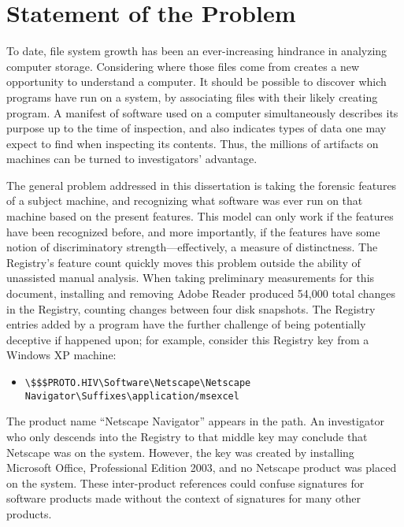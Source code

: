 \documentclass[11pt]{ucthesis}
\theoremstyle{plain}
\theoremstyle{definition}
\newcommand{\breakingbackslash}{\textbackslash\allowbreak{}}
\begin{document}
\section{Statement of the Problem}

To date, file system growth has been an ever-increasing hindrance in analyzing computer storage.  Considering where those files come from creates a new opportunity to understand a computer.  It should be possible to discover which programs have run on a system, by associating files with their likely creating program.  A manifest of software used on a computer simultaneously describes its purpose up to the time of inspection, and also indicates types of data one may expect to find when inspecting its contents.  Thus, the millions of artifacts on machines can be turned to investigators' advantage.

The general problem addressed in this dissertation is taking the forensic features of a subject machine, and recognizing what software was ever run on that machine based on the present features.  This model can only work if the features have been recognized before, and more importantly, if the features have some notion of discriminatory strength---effectively, a measure of distinctness.  The Registry's feature count quickly moves this problem outside the ability of unassisted manual analysis.  When taking preliminary measurements for this document, installing and removing Adobe Reader produced 54,000 total changes in the Registry, counting changes between four disk snapshots.  The Registry entries added by a program have the further challenge of being potentially deceptive if happened upon; for example, consider this Registry key from a Windows XP machine:

\begin{itemize}
\item \texttt{{\breakingbackslash}\$\$\$PROTO.HIV{\breakingbackslash}Software{\breakingbackslash}Netscape{\breakingbackslash}Netscape Navigator{\breakingbackslash}{\newline}Suffixes{\breakingbackslash}application/msexcel}
\end{itemize}

The product name ``Netscape Navigator'' appears in the path.  An investigator who only descends into the Registry to that middle key may conclude that Netscape was on the system.  However, the key was created by installing Microsoft Office, Professional Edition 2003, and no Netscape product was placed on the system.  These inter-product references could confuse signatures for software products made without the context of signatures for many other products.
\end{document}
